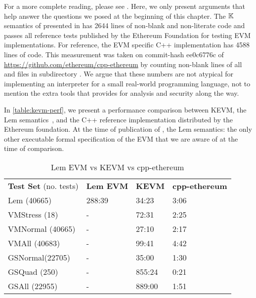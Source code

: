 For a more complete reading, please see
\cite{HildenbrandtCSF18}. Here, we only present arguments that
help answer the questions we posed at the beginning of this chapter.
The $\mathbb{K}{}$ semantics of \EVM{} presented in \cite{HildenbrandtCSF18}
has 2644 lines of non-blank and non-literate code and passes
all reference tests published by the Ethereum Foundation for testing
EVM implementations. For reference,
the EVM specific C++ implementation has 4588 lines of code.
This measurement was taken on commit-hash ee0c6776c of
\url{https://github.com/ethereum/cpp-ethereum}
by counting non-blank lines of all  and  files
in subdirectory .
We argue that these numbers are not atypical for implementing an
interpreter for a small real-world programming language,
not to mention the extra tools that \K{} provides for analysis and security along the way.

In \autoref{table:kevm-perf}, we present a performance comparison between KEVM,
the Lem semantics~\cite{HiraiWSTC17},
and the C++ reference implementation distributed by the Ethereum foundation.
At the time of publication of \cite{HildenbrandtCSF18}, the Lem semantics:
the only other executable formal specification of the EVM that we are aware of
at the time of comparison.

\begin{table}[h]
    \centering
      \begin{tabular}{ l l l l }
          \textbf{Test Set} (no. tests) & \textbf{Lem EVM} & \textbf{KEVM} & \textbf{cpp-ethereum} \\
          Lem (40665)                   & 288:39           & 34:23         & 3:06                  \\
          VMStress (18)                 & -                & 72:31         & 2:25                  \\
          VMNormal (40665)              & -                & 27:10         & 2:17                  \\
          VMAll (40683)                 & -                & 99:41         & 4:42                  \\
          GSNormal(22705)               & -                & 35:00         & 1:30                  \\
          GSQuad (250)                  & -                & 855:24        & 0:21                  \\
          GSAll (22955)                 & -                & 889:00        & 1:51                  \\
      \end{tabular}
  \caption{Lem EVM vs KEVM vs cpp-ethereum} \label{table:kevm-perf}
\end{table}


